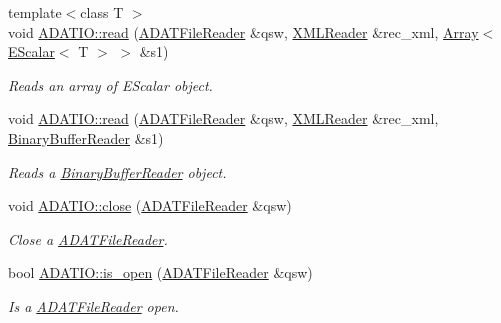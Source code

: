 \begin{DoxyCompactItemize}
{\footnotesize template$<$class T $>$ }\\void \mbox{\hyperlink{group__qio_ga2505d6fa25fdce3f9d953179afc3532e}{A\+D\+A\+T\+I\+O\+::read}} (\mbox{\hyperlink{classADATIO_1_1ADATFileReader}{A\+D\+A\+T\+File\+Reader}} \&qsw, \mbox{\hyperlink{classADATXML_1_1XMLReader}{X\+M\+L\+Reader}} \&rec\+\_\+xml, \mbox{\hyperlink{classXMLArray_1_1Array}{Array}}$<$ \mbox{\hyperlink{classENSEM_1_1EScalar}{E\+Scalar}}$<$ T $>$ $>$ \&s1)
\begin{DoxyCompactList}\small\item\em Reads an array of E\+Scalar object. \end{DoxyCompactList}\item 
void \mbox{\hyperlink{group__qio_gad349a61627372c07f82a004b876423b8}{A\+D\+A\+T\+I\+O\+::read}} (\mbox{\hyperlink{classADATIO_1_1ADATFileReader}{A\+D\+A\+T\+File\+Reader}} \&qsw, \mbox{\hyperlink{classADATXML_1_1XMLReader}{X\+M\+L\+Reader}} \&rec\+\_\+xml, \mbox{\hyperlink{classADATIO_1_1BinaryBufferReader}{Binary\+Buffer\+Reader}} \&s1)
\begin{DoxyCompactList}\small\item\em Reads a \mbox{\hyperlink{classADATIO_1_1BinaryBufferReader}{Binary\+Buffer\+Reader}} object. \end{DoxyCompactList}\item 
void \mbox{\hyperlink{group__qio_gac32c771b58d87e4ef4af62a7ad2e5c0d}{A\+D\+A\+T\+I\+O\+::close}} (\mbox{\hyperlink{classADATIO_1_1ADATFileReader}{A\+D\+A\+T\+File\+Reader}} \&qsw)
\begin{DoxyCompactList}\small\item\em Close a \mbox{\hyperlink{classADATIO_1_1ADATFileReader}{A\+D\+A\+T\+File\+Reader}}. \end{DoxyCompactList}\item 
bool \mbox{\hyperlink{group__qio_gad9b8cab72f011dd46c24a51e8a1c756a}{A\+D\+A\+T\+I\+O\+::is\+\_\+open}} (\mbox{\hyperlink{classADATIO_1_1ADATFileReader}{A\+D\+A\+T\+File\+Reader}} \&qsw)
\begin{DoxyCompactList}\small\item\em Is a \mbox{\hyperlink{classADATIO_1_1ADATFileReader}{A\+D\+A\+T\+File\+Reader}} open. \end{DoxyCompactList}\end{DoxyCompactItemize}
